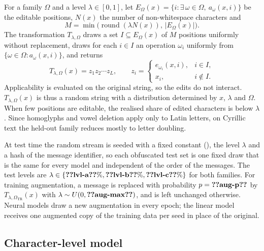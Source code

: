 For a family $\Omega$ and a level $\lambda\in[0,1]$, let $E_\Omega(x)=\{i:\exists\,\omega\in\Omega,\ a_\omega(x,i)\}$ be the editable positions, $N(x)$ the number of non-whitespace characters and
\begin{equation}\label{eq:nops}
M=\min\bigl(\operatorname{round}(\lambda N(x)),\,|E_\Omega(x)|\bigr).
\end{equation}
The transformation $T_{\lambda,\Omega}$ draws a set $I\subseteq E_\Omega(x)$ of $M$ positions uniformly without replacement, draws for each $i\in I$ an operation $\omega_i$ uniformly from $\{\omega\in\Omega:a_\omega(x,i)\}$, and returns
\begin{equation}\label{eq:obf}
T_{\lambda,\Omega}(x)=z_1z_2\cdots z_L,\qquad z_i=\begin{cases}e_{\omega_i}(x,i),& i\in I,\\ x_i,& i\notin I.\end{cases}
\end{equation}
Applicability is evaluated on the original string, so the edits do not interact. $T_{\lambda,\Omega}(x)$ is thus a random string with a distribution determined by $x$, $\lambda$ and $\Omega$. When few positions are editable, the realised share of edited characters is below $\lambda$. Since homoglyphs and vowel deletion apply only to Latin letters, on Cyrillic text the held-out family reduces mostly to letter doubling.

At test time the random stream is seeded with a fixed constant (), the level $\lambda$ and a hash of the message identifier, so each obfuscated test set is one fixed draw that is the same for every model and independent of the order of the messages. The test levels are $\lambda\in\{\val{lvl-a}\%,\val{lvl-b}\%,\val{lvl-c}\%\}$ for both families. For training augmentation, a message is replaced with probability $p=\val{aug-p}$ by $T_{\lambda,\Omega_{\mathrm{TR}}}(x)$ with $\lambda\sim U(0,\val{aug-max})$, and is left unchanged otherwise. Neural models draw a new augmentation in every epoch; the linear model receives one augmented copy of the training data per seed in place of the original.

\subsection{Character-level model}\label{sec:lite}


